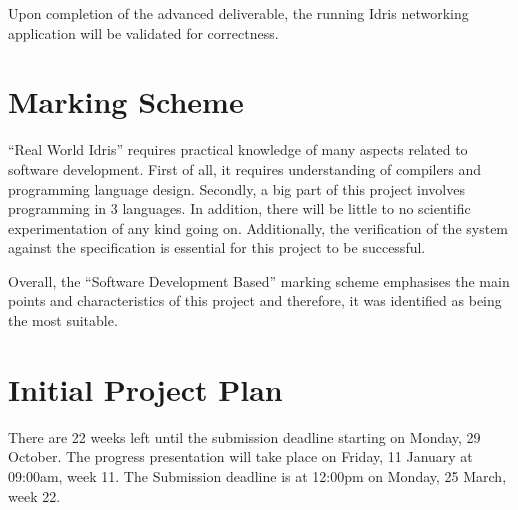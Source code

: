 \documentclass[a4paper, 12pt, oneside]{report}
\begin{document}
Upon completion of the advanced deliverable, the running Idris networking
application will be validated for correctness.



\section{Marking Scheme}
``Real World Idris'' requires practical knowledge of many aspects related to
software development.
First of all, it requires understanding of compilers and programming language
design.
Secondly, a big part of this project involves programming in 3 languages.
In addition, there will be little to no scientific experimentation of any kind
going on.
Additionally, the verification of the system against the specification is
essential for this project to be successful.

Overall, the ``Software Development Based'' marking scheme
emphasises the main points and characteristics of this project and therefore,
it was identified as being the most suitable.




\section{Initial Project Plan}
There are 22 weeks left until the submission deadline starting on Monday,
29 October.
The progress presentation will take place on Friday, 11 January at
09:00am, week 11.
The Submission deadline is at 12:00pm on Monday, 25 March, week 22.
\end{document}
